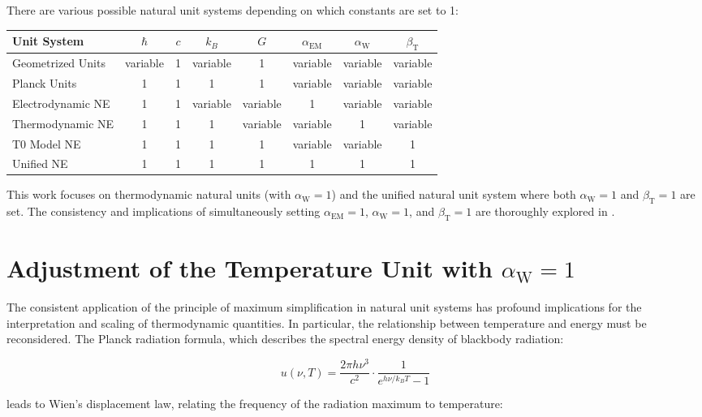 \documentclass[12pt,a4paper]{article}
\newcommand{\betaT}{\beta_{\text{T}}}
\newcommand{\alphaEM}{\alpha_{\text{EM}}}
\newcommand{\alphaW}{\alpha_{\text{W}}}
\begin{document}
	There are various possible natural unit systems depending on which constants are set to 1:
	
	\begin{center}
		\begin{tabular}{|l|c|c|c|c|c|c|c|}
			\hline
			\textbf{Unit System} & \(\hbar\) & \(c\) & \(k_B\) & \(G\) & \(\alphaEM\) & \(\alphaW\) & \(\betaT\) \\
			\hline
			Geometrized Units & variable & 1 & variable & 1 & variable & variable & variable \\
			Planck Units & 1 & 1 & 1 & 1 & variable & variable & variable \\
			Electrodynamic NE & 1 & 1 & variable & variable & 1 & variable & variable \\
			Thermodynamic NE & 1 & 1 & 1 & variable & variable & 1 & variable \\
			T0 Model NE & 1 & 1 & 1 & 1 & variable & variable & 1 \\
			Unified NE & 1 & 1 & 1 & 1 & 1 & 1 & 1 \\
			\hline
		\end{tabular}
	\end{center}
	
	This work focuses on thermodynamic natural units (with \(\alphaW = 1\)) and the unified natural unit system where both \(\alphaW = 1\) and \(\betaT = 1\) are set. The consistency and implications of simultaneously setting \(\alphaEM = 1\), \(\alphaW = 1\), and \(\betaT = 1\) are thoroughly explored in \cite{pascher_alphabeta_2025}.
	
	\section{Adjustment of the Temperature Unit with \(\alphaW = 1\)}
	
	The consistent application of the principle of maximum simplification in natural unit systems has profound implications for the interpretation and scaling of thermodynamic quantities. In particular, the relationship between temperature and energy must be reconsidered. The Planck radiation formula, which describes the spectral energy density of blackbody radiation:
	
	\begin{equation}
		u(\nu, T) = \frac{2\pi h \nu^3}{c^2} \cdot \frac{1}{e^{h \nu / k_B T} - 1}
	\end{equation}
	
	leads to Wien's displacement law, relating the frequency of the radiation maximum to temperature:
	
\end{document}
